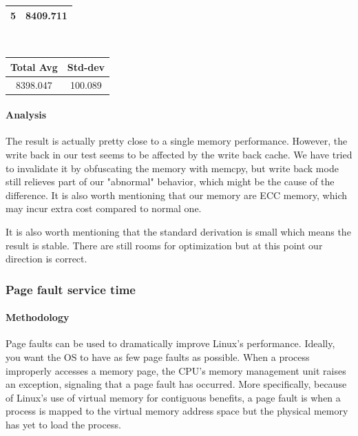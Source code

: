 \begin{enumerate}
\begin{center}
\begin{tabular}{||c c||}
                 \hline
                 5 & 8409.711   \\ 
                 \hline
                 \hline
                \end{tabular} \\
                \begin{tabular}{||c c||} 
                 \hline
                 Total Avg & Std-dev \\ [0.5ex] 
                 \hline\hline
                 8398.047 & 100.089 \\ 
                 \hline
                \hline
            \end{tabular}
        \end{center}
\end{enumerate}

\paragraph{Analysis}

The result is actually pretty close to a single memory performance. However, the write back in our test seems to be affected by the write back cache. We have tried to invalidate it by obfuscating the memory with memcpy, but write back mode still relieves part of our "abnormal" behavior, which might be the cause of the difference. It is also worth mentioning that our memory are ECC memory, which may incur extra cost compared to normal one.

It is also worth mentioning that the standard derivation is small which means the result is stable. There are still rooms for optimization but at this point our direction is correct.


\subsubsection{Page fault service time} 


\paragraph{Methodology}

Page faults can be used to dramatically improve Linux's performance. Ideally, you want the OS to have as few page faults as possible. When a process improperly accesses a memory page, the CPU's memory management unit raises an exception, signaling that a page fault has occurred. More specifically, because of Linux's use of virtual memory for contiguous benefits, a page fault is when a process is mapped to the virtual memory address space but the physical memory has yet to load the process.

